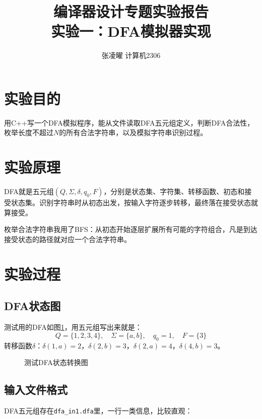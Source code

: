 \documentclass[12pt,a4paper]{ctexart}
\title{\textbf{编译器设计专题实验报告}\\[0.5em]\Large\color{themecolor}实验一：DFA模拟器实现}
\author{张凌曜 \quad 2234214014 \quad 计算机2306}
\date{}
\begin{document}
\maketitle
\thispagestyle{empty}

\section{实验目的}
用C++写一个DFA模拟程序，能从文件读取DFA五元组定义，判断DFA合法性，枚举长度不超过$N$的所有合法字符串，以及模拟字符串识别过程。

\section{实验原理}
DFA就是五元组$(Q, \Sigma, \delta, q_0, F)$，分别是状态集、字符集、转移函数、初态和接受状态集。识别字符串时从初态出发，按输入字符逐步转移，最终落在接受状态就算接受。

枚举合法字符串我用了BFS：从初态开始逐层扩展所有可能的字符组合，凡是到达接受状态的路径就对应一个合法字符串。

\section{实验过程}

\subsection{DFA状态图}
测试用的DFA如图\ref{fig:dfa}，用五元组写出来就是：
\[Q=\{1,2,3,4\},\quad \Sigma=\{a,b\},\quad q_0=1,\quad F=\{3\}\]
转移函数$\delta$：$\delta(1,a)=2$，$\delta(2,b)=3$，$\delta(2,a)=4$，$\delta(4,b)=3$。

\begin{figure}[h]
\centering
{}
\caption{测试DFA状态转换图}
\label{fig:dfa}
\end{figure}

\subsection{输入文件格式}
DFA五元组存在\texttt{dfa\_in1.dfa}里，一行一类信息，比较直观：
\end{document}
